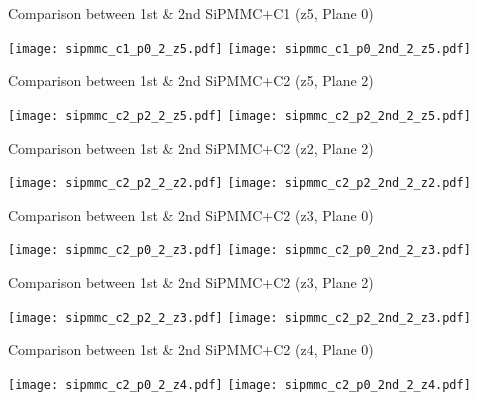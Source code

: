 \documentclass{beamer}
\begin{document}
\begin{frame}{Comparison between 1st \& 2nd SiPMMC+C1 (z5, Plane 0)}
\begin{adjustwidth}{-1.5em}{-1.5em}
	\texttt{[image: sipmmc\_c1\_p0\_2\_z5.pdf]}
	\texttt{[image: sipmmc\_c1\_p0\_2nd\_2\_z5.pdf]}
\end{adjustwidth}
\end{frame}

\begin{frame}{Comparison between 1st \& 2nd SiPMMC+C2 (z5, Plane 2)}
\begin{adjustwidth}{-1.5em}{-1.5em}
	\texttt{[image: sipmmc\_c2\_p2\_2\_z5.pdf]}
	\texttt{[image: sipmmc\_c2\_p2\_2nd\_2\_z5.pdf]}
\end{adjustwidth}
\end{frame}


\begin{frame}{Comparison between 1st \& 2nd SiPMMC+C2 (z2, Plane 2)}
\begin{adjustwidth}{-1.5em}{-1.5em}
	\texttt{[image: sipmmc\_c2\_p2\_2\_z2.pdf]}
	\texttt{[image: sipmmc\_c2\_p2\_2nd\_2\_z2.pdf]}
\end{adjustwidth}
\end{frame}

\begin{frame}{Comparison between 1st \& 2nd SiPMMC+C2 (z3, Plane 0)}
\begin{adjustwidth}{-1.5em}{-1.5em}
	\texttt{[image: sipmmc\_c2\_p0\_2\_z3.pdf]}
	\texttt{[image: sipmmc\_c2\_p0\_2nd\_2\_z3.pdf]}
\end{adjustwidth}
\end{frame}

\begin{frame}{Comparison between 1st \& 2nd SiPMMC+C2 (z3, Plane 2)}
\begin{adjustwidth}{-1.5em}{-1.5em}
	\texttt{[image: sipmmc\_c2\_p2\_2\_z3.pdf]}
	\texttt{[image: sipmmc\_c2\_p2\_2nd\_2\_z3.pdf]}
\end{adjustwidth}
\end{frame}

\begin{frame}{Comparison between 1st \& 2nd SiPMMC+C2 (z4, Plane 0)}
\begin{adjustwidth}{-1.5em}{-1.5em}
	\texttt{[image: sipmmc\_c2\_p0\_2\_z4.pdf]}
	\texttt{[image: sipmmc\_c2\_p0\_2nd\_2\_z4.pdf]}
\end{adjustwidth}
\end{frame}
\end{document}
